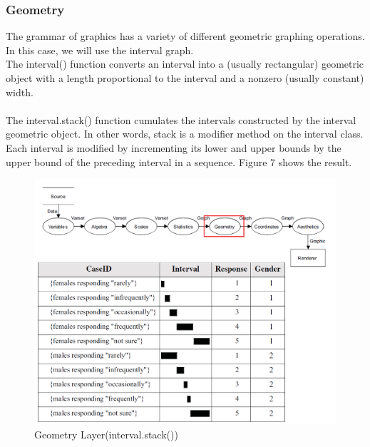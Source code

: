 \documentclass[12pt]{article}
\begin{document}
\subsubsection{Geometry}
The grammar of graphics has a variety of different geometric graphing operations.\\
In this case, we will use the interval graph.\\
The interval() function converts an interval into a (usually rectangular) geometric
object with a length proportional to the interval and a nonzero (usually
constant) width.\\ \\
The interval.stack() function cumulates the intervals constructed by the
interval geometric object. In other words, stack is a modifier method on the interval
class.\\
Each interval is modified by incrementing its lower and upper
bounds by the upper bound of the preceding interval in a sequence.
Figure 7 shows the result.
\begin{figure}[h!]
\caption{Geometry Layer(interval.stack())}
\includegraphics[width=\textwidth]{pic/pre5}
\end{figure}
\newpage
\end{document}

